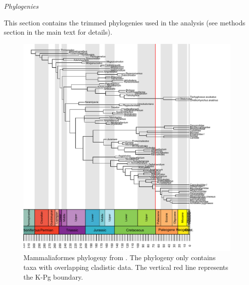 \documentclass[12pt,letterpaper]{article}
\renewcommand{\subsection}[1]{%
\bigskip
\begin{center}
\begin{large}
\normalfont\itshape #1
\end{large}
\end{center}}
\begin{document}
\subsection{Phylogenies}
This section contains the trimmed phylogenies used in the analysis (see methods section in the main text for details).
\begin{figure}[!htbp]
\centering
    \includegraphics[keepaspectratio=true]{Figures/Slater_tree.pdf}
\caption{Mammaliaformes phylogeny from \cite{Slater2012MEE}. The phylogeny only contains taxa with overlapping cladistic data. The vertical red line represents the K-Pg boundary.}
\end{figure}
\end{document}

